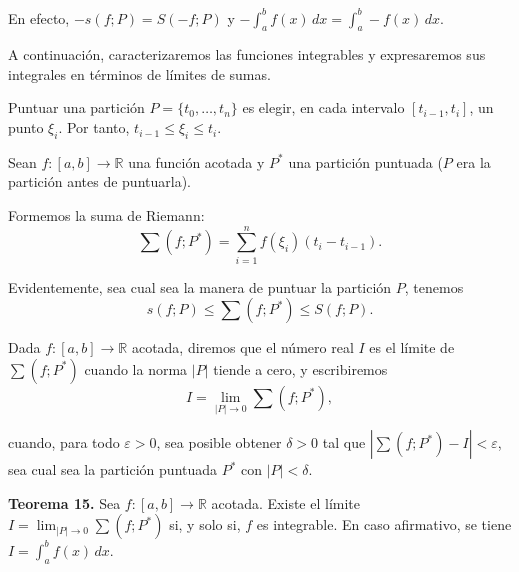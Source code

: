 \documentclass[12pt,oneside]{book}
\begin{document}
En efecto, \(-s(f; P) = S(-f; P)\) y \(- \int_a^b f(x) \, dx = \int_a^b -f(x) \, dx.\)

A continuación, caracterizaremos las funciones integrables y expresaremos sus integrales en términos de límites de sumas.

Puntuar una partición \(P = \{t_0, \dots, t_n\}\) es elegir, en cada intervalo \([t_{i-1}, t_i]\), un punto \(\xi_i\). Por tanto, \(t_{i-1} \leq \xi_i \leq t_i\).

Sean \(f: [a, b] \to \mathbb{R}\) una función acotada y \(P^*\) una partición puntuada (\(P\) era la partición antes de puntuarla).

Formemos la suma de Riemann:
\[
\sum (f; P^*) = \sum_{i=1}^n f(\xi_i)(t_i - t_{i-1}).
\]

Evidentemente, sea cual sea la manera de puntuar la partición \(P\), tenemos
\[
s(f; P) \leq \sum (f; P^*) \leq S(f; P).
\]

Dada \(f: [a, b] \to \mathbb{R}\) acotada, diremos que el número real \(I\) es el límite de \(\sum (f; P^*)\) cuando la norma \(|P|\) tiende a cero, y escribiremos
\[
I = \lim_{|P| \to 0} \sum (f; P^*),
\]

cuando, para todo \(\varepsilon > 0\), sea posible obtener \(\delta > 0\) tal que \(|\sum (f; P^*) - I| < \varepsilon\), sea cual sea la partición puntuada \(P^*\) con \(|P| < \delta\).

\textbf{Teorema 15.} Sea \(f: [a, b] \to \mathbb{R}\) acotada. Existe el límite \(I = \lim_{|P| \to 0} \sum (f; P^*)\) si, y solo si, \(f\) es integrable. En caso afirmativo, se tiene \(I = \int_a^b f(x) \, dx\).
\end{document}
